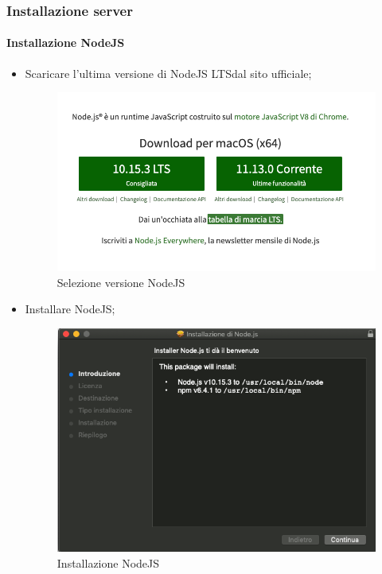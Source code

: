 \subsubsection{Installazione server}\label{installazione_server}
\paragraph{Installazione NodeJS}
	\begin{itemize}
		\item Scaricare l'ultima versione di NodeJS LTS\glossario dal sito ufficiale; 
		\begin{figure}[H]
		\begin{center}
			\includegraphics[scale=0.5]{./images/nodejs.png} 
		\end{center}
		\caption{Selezione versione NodeJS}
	\end{figure}
	\item Installare NodeJS; 
		\begin{figure}[H]
		\begin{center}
			\includegraphics[scale=0.5]{./images/install_nodejs.png} 
		\end{center}
		\caption{Installazione NodeJS}
	\end{figure}	
	\end{itemize}

